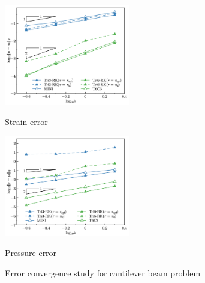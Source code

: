 \begin{figure}[H]
\centering
\begin{subcaptiongroup}
\centering
\parbox[b]{0.49\textwidth}{
     \DIFaddbeginFL \includegraphics[width=0.49\textwidth]{png/cantilever_tri_Hdev.png}
    \DIFaddendFL \caption{Strain error} \DIFaddbeginFL \label{fg:cantilever_convergence_strain_tri}
\DIFaddendFL }
\parbox[b]{0.49\textwidth}{
     \DIFaddbeginFL \includegraphics[width=0.49\textwidth]{png/cantilever_tri_L2_p.png}
    \DIFaddendFL \caption{Pressure error} \DIFaddbeginFL \label{fg:cantilever_convergence_pressure_tri}
\DIFaddendFL }
\end{subcaptiongroup}
\caption{Error convergence study for cantilever beam problem \DIFaddbeginFL {}\DIFaddendFL }\DIFaddbeginFL \label{fg:cantilever_convergence_tri}
\end{figure}

